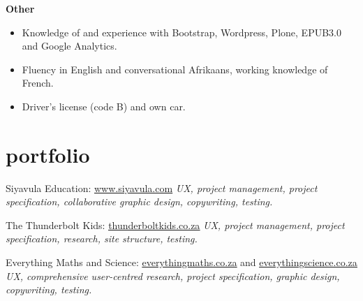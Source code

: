 \documentclass[]{friggeri-cv} %
\begin{document}
\textbf{Other}
\begin{itemize}
\item Knowledge of and experience with Bootstrap, Wordpress, Plone, EPUB3.0 and Google Analytics.
 \item Fluency in English and conversational Afrikaans, working knowledge of French.
 \item Driver's license (code B) and own car.
\end{itemize}



\section{portfolio}
\begin{sitelist}

\site
{}
{Siyavula Education: \href{http://www.siyavula.com}{\underline{www.siyavula.com}}}
{}
{\emph{UX, project management, project specification, collaborative graphic design, copywriting, testing.}}


\site
{}
{The Thunderbolt Kids: \href{http://thunderboltkids.co.za}{\underline{thunderboltkids.co.za}}}
{}
{\emph{UX, project management, project specification, research, site structure, testing.}}

\site
{}
{Everything Maths and Science: \href{http://www.everythingmaths.co.za}{\underline{everythingmaths.co.za}} and \href{http://www.everythingmaths.co.za}{\underline{everythingscience.co.za}}}
{}
{\emph{UX, comprehensive user-centred research, project specification, graphic design, copywriting, testing.}}


\end{sitelist}

\end{document}
